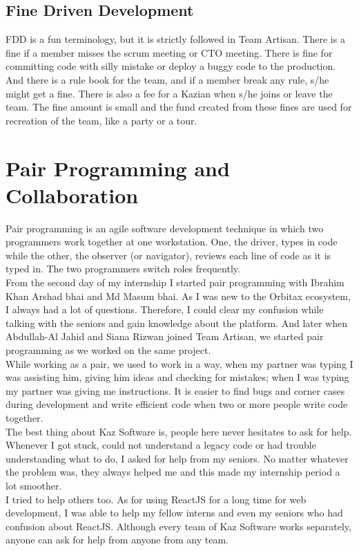 \subsection{Fine Driven Development}

FDD is a fun terminology, but it is strictly followed in Team Artisan.
There is a fine if a member misses the scrum meeting or CTO meeting.
There is fine for committing code with silly mistake or deploy a buggy code to the production.
And there is a rule book for the team, and if a member break any rule, s/he might get a fine.
There is also a fee for a Kazian when s/he joins or leave the team.
The fine amount is small and the fund created from these fines are used for recreation of the team, like a party or a tour.

\section{Pair Programming and Collaboration}

Pair programming is an agile software development technique in which two programmers work together at one workstation. One, the driver, types in code
while the other, the observer (or navigator), reviews each line of code as it is typed in. The two programmers switch roles frequently.\\

From the second day of my internship I started pair programming with Ibrahim Khan Arshad bhai and Md Masum bhai.
As I was new to the Orbitax ecosystem, I always had a lot of questions.
Therefore, I could clear my confusion while talking with the seniors and gain knowledge about the platform.
And later when Abdullah-Al Jahid and Siana Rizwan joined Team Artisan, we started pair programming as we worked on the same project.\\

While working as a pair, we used to work in a way, when my partner was typing I was assisting him, giving him ideas and checking for mistakes; when I was typing my partner was giving me instructions.
It is easier to find bugs and corner cases during development and write efficient code when two or more people write code together.\\

The best thing about Kaz Software is, people here never hesitates to ask for help.
Whenever I got stuck, could not understand a legacy code or had trouble understanding what to do, I asked for help from my seniors.
No matter whatever the problem was, they always helped me and this made my internship period a lot smoother.\\

I tried to help others too.
As for using ReactJS for a long time for web development, I was able to help my fellow interns and even my seniors who had confusion about ReactJS.
Although every team of Kaz Software works separately, anyone can ask for help from anyone from any team.

